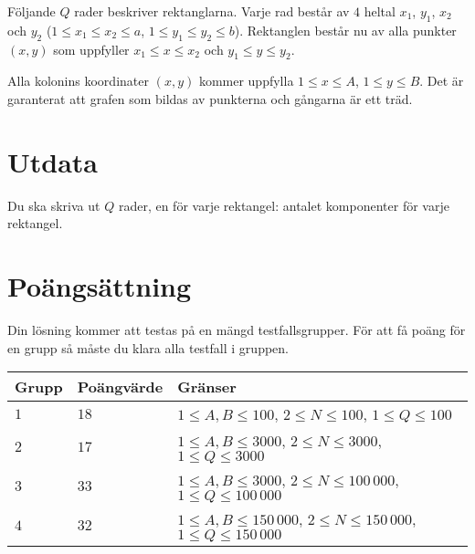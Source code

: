 Följande $Q$ rader beskriver rektanglarna.
Varje rad består av $4$ heltal $x_1$, $y_1$, $x_2$ och $y_2$ ($1 \leq x_1 \leq x_2 \leq a$, $1 \leq y_1 \leq y_2 \leq b$).
Rektanglen består nu av alla punkter $(x,y)$ som uppfyller $x_1 \leq x \leq x_2$ och $y_1 \leq y \leq y_2$.

Alla kolonins koordinater $(x, y)$ kommer uppfylla $1 \leq x \leq A$, $1 \leq y \leq B$.
Det är garanterat att grafen som bildas av punkterna och gångarna är ett träd.

\section*{Utdata}
Du ska skriva ut $Q$ rader, en för varje rektangel: antalet komponenter för varje rektangel.

\section*{Poängsättning}
Din lösning kommer att testas på en mängd testfallsgrupper.
För att få poäng för en grupp så måste du klara alla testfall i gruppen.

\noindent
\begin{tabular}{| l | l | l |}
\hline
Grupp & Poängvärde & Gränser \\ \hline
$1$    & $18$         & $1 \leq A, B \leq 100$, $2 \leq N \leq 100$, $1 \leq Q \leq 100$ \\ \hline
$2$    & $17$         & $1 \leq A, B \leq 3000$, $2 \leq N \leq 3000$, $1 \leq Q \leq 3000$ \\ \hline
$3$    & $33$         & $1 \leq A, B \leq 3000$, $2 \leq N \leq 100\,000$, $1 \leq Q \leq 100\,000$ \\ \hline
$4$    & $32$         & $1 \leq A, B \leq 150\,000$, $2 \leq N \leq 150\,000$, $1 \leq Q \leq 150\,000$ \\ \hline
\end{tabular}
